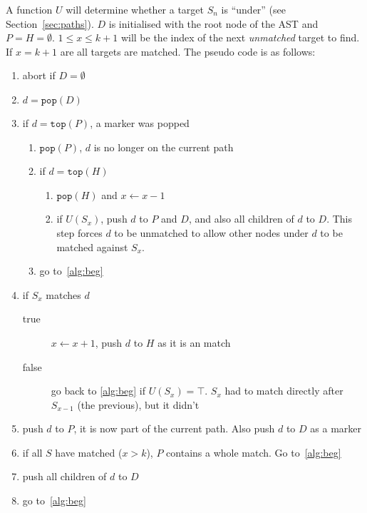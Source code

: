\documentclass[a4paper,12pt]{article}
\begin{document}
A function $U$
will determine whether a target $S_n$ is ``under'' (see Section~\ref{sec:paths}). $D$ is
initialised with the root node of the AST and $P = H = \emptyset$. $1 \leq x \leq k+1$ will be the index of
the next \emph{unmatched} target to find. If $x = k+1$ are all targets are matched.
The pseudo code is as follows:

\begin{enumerate}[noitemsep]
  \item\label{alg:beg} abort if $D = \emptyset$
  \item $d = \mathtt{pop}(D)$
  \item if $d = \mathtt{top}(P)$, a marker was popped
    \begin{enumerate}
      \item $\mathtt{pop}(P)$, $d$ is no longer on the current path
      \item if $d = \mathtt{top}(H)$
      \begin{enumerate}
        \item $\mathtt{pop}(H)$ and $x \gets x-1$
        \item if $U(S_x)$, push $d$ to $P$ and $D$, and also all children of $d$ to $D$.
        This step forces $d$ to be unmatched to allow other nodes under $d$ to
        be matched against $S_x$.
      \end{enumerate}
      \item go to~\ref{alg:beg}
    \end{enumerate}
  \item if $S_x$ matches $d$
    \begin{description}
      \item[true] $x \gets x+1$, push $d$ to $H$ as it is an match
      \item[false] go back to \ref{alg:beg} if $U(S_x) = \top$. $S_x$ had to match
      directly after $S_{x-1}$ (the previous), but it didn't
    \end{description}
  \item push $d$ to $P$, it is now part of the current path. Also push $d$ to $D$ as a marker
  \item if all $S$ have matched ($x > k$), $P$ contains a whole match. Go to~\ref{alg:beg}
  \item push all children of $d$ to $D$
  \item go to~\ref{alg:beg}
\end{enumerate}
\end{document}
